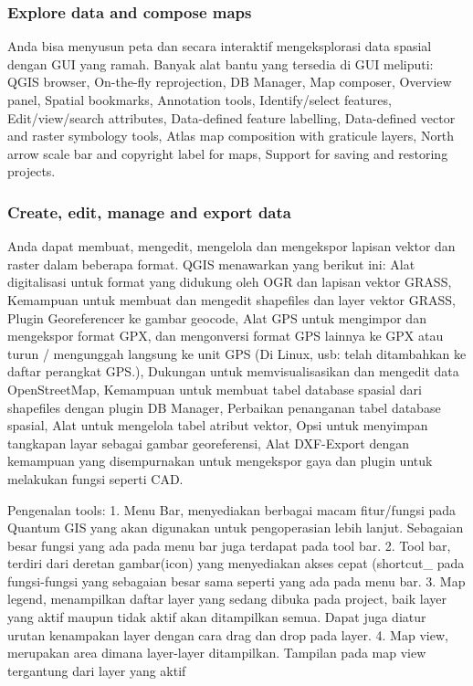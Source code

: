 \subsubsection {Explore data and compose maps}
Anda bisa menyusun peta dan secara interaktif mengeksplorasi data spasial dengan GUI yang ramah. Banyak alat bantu yang tersedia di GUI meliputi: QGIS browser, On-the-fly reprojection, DB Manager, Map composer, Overview panel, Spatial bookmarks, Annotation tools, Identify/select features, Edit/view/search attributes, Data-defined feature labelling, Data-defined vector and raster symbology tools, Atlas map composition with graticule layers, North arrow scale bar and copyright label for maps, Support for saving and restoring projects.
\subsubsection{Create, edit, manage and export data}
Anda dapat membuat, mengedit, mengelola dan mengekspor lapisan vektor dan raster dalam beberapa format. QGIS menawarkan yang berikut ini: Alat digitalisasi untuk format yang didukung oleh OGR dan lapisan vektor GRASS, Kemampuan untuk membuat dan mengedit shapefiles dan layer vektor GRASS, Plugin Georeferencer ke gambar geocode, Alat GPS untuk mengimpor dan mengekspor format GPX, dan mengonversi format GPS lainnya ke GPX atau turun / mengunggah langsung ke unit GPS (Di Linux, usb: telah ditambahkan ke daftar perangkat GPS.), Dukungan untuk memvisualisasikan dan mengedit data OpenStreetMap, Kemampuan untuk membuat tabel database spasial dari shapefiles dengan plugin DB Manager, Perbaikan penanganan tabel database spasial, Alat untuk mengelola tabel atribut vektor, Opsi untuk menyimpan tangkapan layar sebagai gambar georeferensi, Alat DXF-Export dengan kemampuan yang disempurnakan untuk mengekspor gaya dan plugin untuk melakukan fungsi seperti CAD.

Pengenalan tools:
1.	Menu Bar, menyediakan berbagai macam fitur/fungsi pada Quantum GIS yang akan digunakan untuk pengoperasian lebih lanjut. Sebagaian besar fungsi yang ada pada menu bar juga terdapat pada tool bar.
2.	Tool bar, terdiri dari deretan gambar(icon) yang menyediakan akses cepat (shortcut_ pada fungsi-fungsi yang sebagaian besar sama seperti yang ada pada menu bar.
3. Map legend, menampilkan daftar layer yang sedang dibuka pada project, baik layer yang aktif maupun tidak aktif akan ditampilkan semua. Dapat juga diatur urutan kenampakan layer dengan cara drag dan drop pada layer.
4. Map view, merupakan area dimana layer-layer ditampilkan. Tampilan pada map view tergantung dari layer yang aktif
